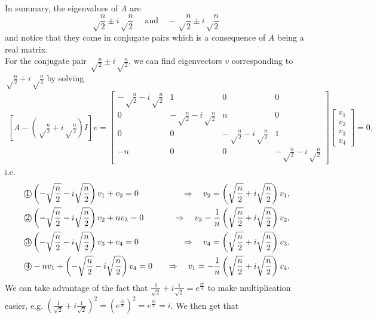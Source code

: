\documentclass[11pt]{article}
\theoremstyle{definition}
\begin{document}
\begin{enumerate}[leftmargin=*]
\begin{center}
\begin{tikzpicture}
\end{tikzpicture}
\end{center}
In summary, the eigenvalues of $A$ are 
\[
\boxed{\sqrt\frac{n}{2}\pm i\sqrt\frac{n}{2}\quad \text{ and} \quad -\sqrt\frac{n}{2}\pm i\sqrt\frac{n}{2}}
\]
 and notice that they come in conjugate pairs which is a consequence of $A$ being a real matrix.  \\

For the conjugate pair $\sqrt \frac{n}{ 2}\pm i\sqrt \frac{n}{2}$, we can find eigenvectors $v$ corresponding to $\sqrt \frac{n}{ 2}+ i\sqrt \frac{n}{2}$ by solving 
\begin{eqnarray*}
\left[A-\left(\sqrt\frac{n}{2}+ i\sqrt\frac{n}{2}\right)I\right]v=
\begin{bmatrix}
-\sqrt\frac{n}{2}- i\sqrt\frac{n}{2}&1&0&0\\
0 &-\sqrt\frac{n}{2}- i\sqrt\frac{n}{2}&n&0\\
0&0& -\sqrt\frac{n}{2}- i\sqrt\frac{n}{2}&1\\
-n&0&0&-\sqrt\frac{n}{2}- i\sqrt\frac{n}{2}
\end{bmatrix}\begin{bmatrix}v_1\\v_2\\v_3\\v_4 \end{bmatrix}=0,
\end{eqnarray*}
i.e.
\begin{eqnarray*}
\text{ \textcircled{1}}& \left(-\sqrt\frac{n}{2}- i\sqrt\frac{n}{2}\right)v_1+v_2=0 \quad & 
\Rightarrow  \quad  v_2= \left(\sqrt\frac{n}{2}+ i\sqrt\frac{n}{2}\right)v_1,   \\
\text{\textcircled{2}}& \left(-\sqrt\frac{n}{2}- i\sqrt\frac{n}{2}\right)v_2+nv_3=0  \quad & \Rightarrow  \quad  v_3=\frac{1}{n}\left(\sqrt\frac{n}{2}+ i\sqrt\frac{n}{2}\right)v_2,   \\
\text{\textcircled{3}} &  \left(-\sqrt\frac{n}{2}- i\sqrt\frac{n}{2}\right)v_3+v_4=0  \quad & \Rightarrow  \quad   v_4=\left(\sqrt\frac{n}{2}+ i\sqrt\frac{n}{2}\right)v_3,  \\
\text{\textcircled{4}}&  -nv_1+\left(-\sqrt\frac{n}{2}- i\sqrt\frac{n}{2}\right)v_4=0 \quad  &\Rightarrow  \quad   v_1=-\frac{1}{n}\left(\sqrt\frac{n}{2}+ i\sqrt\frac{n}{2}\right)v_4.  \\
\end{eqnarray*}
We can take advantage of the fact that $\frac{1}{\sqrt 2}+ i\frac{1}{\sqrt 2}=e^{\frac{i\pi}{4}}$ to make multiplication easier, e.g.  $\left(\frac{1}{\sqrt 2}+ i\frac{1}{\sqrt 2}\right)^2=\left(e^{\frac{i\pi}{4}}\right)^2=e^{\frac{i\pi}{2}}=i$.  We then get that 

\end{enumerate}
\end{document}
